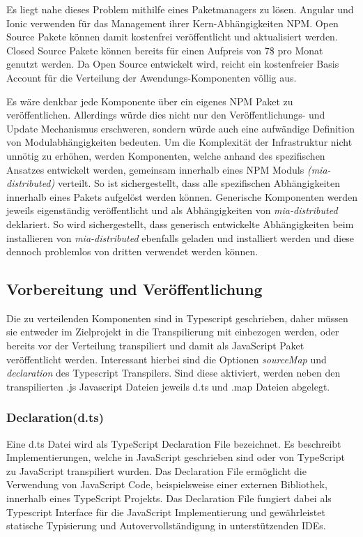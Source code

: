 Es liegt nahe dieses Problem mithilfe eines Paketmanagers zu lösen. Angular und Ionic verwenden für das Management
ihrer Kern-Abhängigkeiten \ac{NPM}.
Open Source Pakete können damit kostenfrei veröffentlicht und aktualisiert werden. Closed Source Pakete können
bereits für einen Aufpreis von 7\$ pro Monat genutzt werden.
Da \projectname{} Open Source entwickelt wird,
reicht ein kostenfreier Basis Account für die Verteilung der Awendungs-Komponenten völlig aus.

Es wäre denkbar jede Komponente über ein eigenes \ac{NPM} Paket zu veröffentlichen.
Allerdings würde dies nicht nur den Veröffentlichungs- und Update Mechanismus erschweren,
sondern würde auch eine aufwändige Definition von Modulabhängigkeiten bedeuten.
Um die Komplexität der Infrastruktur nicht unnötig zu erhöhen,
werden Komponenten, welche anhand des spezifischen Ansatzes entwickelt werden,
gemeinsam innerhalb eines \ac{NPM} Moduls \emph{(mia-distributed)} verteilt.
So ist sichergestellt, dass alle spezifischen Abhängigkeiten innerhalb eines Pakets aufgelöst werden können.
Generische Komponenten werden jeweils eigenständig veröffentlicht und als Abhängigkeiten von \emph {mia-distributed} deklariert.
So wird sichergestellt, dass generisch entwickelte Abhängigkeiten beim installieren von \emph{mia-distributed}
ebenfalls geladen und installiert werden und diese dennoch problemlos von dritten verwendet werden können.

\subsection{Vorbereitung und Veröffentlichung}

Die zu verteilenden Komponenten sind in Typescript geschrieben,
daher müssen sie entweder im Zielprojekt in die Transpilierung mit einbezogen werden,
oder bereits vor der Verteilung transpiliert und damit als JavaScript Paket veröffentlicht werden.
Interessant hierbei sind die Optionen \emph{sourceMap} und \emph{declaration} des Typescript Transpilers.
Sind diese aktiviert, werden neben den transpilierten .js Javascript Dateien jeweils d.ts und .map Dateien abgelegt.

\subsubsection{Declaration(d.ts)}

Eine d.ts Datei wird als TypeScript Declaration File bezeichnet.
Es beschreibt Implementierungen, welche in JavaScript geschrieben sind oder von TypeScript zu JavaScript transpiliert wurden.
Das Declaration File ermöglicht die Verwendung von JavaScript Code, beispielsweise einer externen Bibliothek,
innerhalb eines TypeScript Projekts. Das Declaration File fungiert dabei als Typescript Interface
für die JavaScript Implementierung und gewährleistet statische Typisierung
und Autovervollständigung in unterstützenden IDEs.


